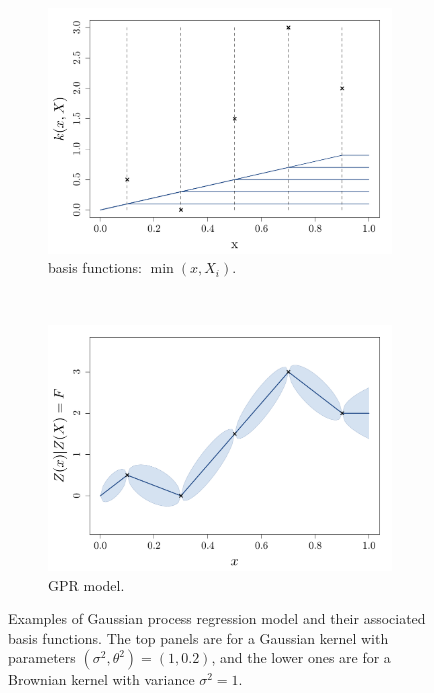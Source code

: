 \documentclass[twoside,openright]{report}
\begin{document}
\begin{figure}
\begin{subfigure}[t]{0.45\textwidth}
                \includegraphics[width=\textwidth]{figures/ch2_basisfuncBrown}
                \caption{basis functions: $\min(x,X_i)$.}
        \end{subfigure}%
        ~
        \begin{subfigure}[t]{0.45\textwidth}
                \includegraphics[width=\textwidth]{figures/ch2_GPRbasisfuncBrown}
                \caption{GPR model.}
        \end{subfigure}%
        \caption{Examples of Gaussian process regression model and their associated basis functions. The top panels are for a Gaussian kernel with parameters $(\sigma^2,\theta^2)=(1,0.2)$, and the lower ones are for a Brownian kernel with variance $\sigma^2 = 1$. }
        \label{fig:GPRbasisfunctions}
\end{figure}
\end{document}
